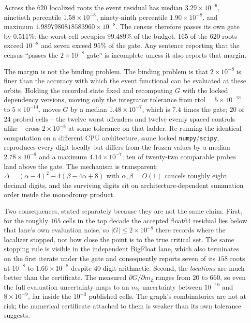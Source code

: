 \documentclass[11pt]{article}
\begin{document}
Across the $620$ localized roots the event residual has median
$3.29\times10^{-9}$, ninetieth percentile $1.58\times10^{-8}$, ninety-ninth
percentile $1.90\times10^{-8}$, and maximum $1.9897980818583960\times10^{-8}$.
The census therefore passes its own gate by $0.511\%$: the worst cell occupies
$99.489\%$ of the budget.  $165$ of the $620$ roots exceed $10^{-8}$ and seven
exceed $95\%$ of the gate.  Any sentence reporting that the census ``passes the
$2\times10^{-8}$ gate'' is incomplete unless it also reports that margin.

The margin is not the binding problem.  The binding problem is that
$2\times10^{-8}$ is finer than the accuracy with which the event functional can
be evaluated at these orbits.  Holding the recorded state fixed and recomputing
$G$ with the locked dependency versions, moving only the integrator tolerance
from $\mathrm{rtol}=5\times10^{-13}$ to $5\times10^{-14}$, moves $G$ by a median
$1.48\times10^{-7}$, which is $7.4$ times the gate; $20$ of $24$ probed cells --
the twelve worst offenders and twelve evenly spaced controls alike -- cross
$2\times10^{-8}$ at some tolerance on that ladder.  Re-running the identical
computation on a different CPU architecture, same locked
\texttt{numpy}/\texttt{scipy}, reproduces every digit locally but differs from
the frozen values by a median $2.78\times10^{-8}$ and a maximum
$4.14\times10^{-7}$; ten of twenty-two comparable probes land above the gate.
The mechanism is transparent: $\Delta=(\alpha-4)^2-4(\beta-4\alpha+8)$ with
$\alpha,\beta=O(1)$ cancels roughly eight decimal digits, and the surviving
digits sit on architecture-dependent summation order inside the monodromy
product.

Two consequences, stated separately because they are not the same claim.
First, for the roughly $165$ cells in the top decade the accepted float64
residual lies below that lane's own evaluation noise, so $|G|\le
2\times10^{-8}$ there records where the localizer stopped, not how close the
point is to the true critical set.  The same stopping rule is visible in the
independent BigFloat lane, which also terminates on the first iterate under the
gate and consequently reports seven of its $158$ roots at $10^{-8}$ to
$1.66\times10^{-8}$ despite $40$-digit arithmetic.
Second, the \emph{locations} are much better than the certificate.  The measured
$\partial G/\partial m_2$ ranges from $20$ to $660$, so even the full evaluation
uncertainty maps to an $m_2$ uncertainty between $10^{-10}$ and $8\times10^{-9}$,
far inside the $10^{-3}$ published cells.  The graph's combinatorics are not at
risk; the numerical certificate attached to them is weaker than its own
tolerance suggests.
\end{document}
